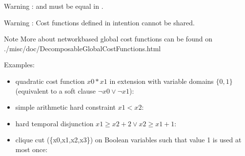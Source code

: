 \documentclass[letterpaper,10pt,openany,oneside,english]{sphinxmanual}
\begin{document}
\begin{fulllineitems}
\sphinxAtStartPar
Warning :  and  must be equal in .

\sphinxAtStartPar
Warning : Cost functions defined in intention cannot be shared.

\sphinxAtStartPar
Note More about network\sphinxhyphen{}based global cost functions can be found on ./misc/doc/DecomposableGlobalCostFunctions.html

\sphinxAtStartPar
Examples:\begin{itemize}
\item {} 
\sphinxAtStartPar
quadratic cost function \(x0 * x1\) in extension with variable domains \(\{0,1\}\) (equivalent to a soft clause \(\neg x0 \vee \neg x1\)):
\begin{sphinxVerbatim}[commandchars=\\\{\}]
        
\end{sphinxVerbatim}


\item {} 
\sphinxAtStartPar
simple arithmetic hard constraint \(x1 < x2\):
\begin{sphinxVerbatim}[commandchars=\\\{\}]
       
\end{sphinxVerbatim}


\item {} 
\sphinxAtStartPar
hard temporal disjunction \(x1 \geq x2 + 2 \vee x2 \geq x1 + 1\):
\begin{sphinxVerbatim}[commandchars=\\\{\}]
        
\end{sphinxVerbatim}


\item {} 
\sphinxAtStartPar
clique cut (\{x0,x1,x2,x3\}) on Boolean variables such that value 1 is used at most once:
\begin{sphinxVerbatim}[commandchars=\\\{\}]
                
\end{sphinxVerbatim}



\end{itemize}
\end{fulllineitems}
\end{document}
